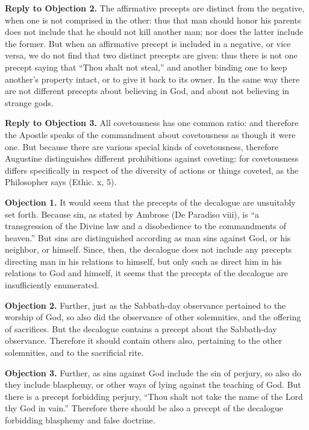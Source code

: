 \textbf{Reply to Objection 2.} The affirmative precepts are distinct from the negative, when one is not comprised in the other: thus that man should honor his parents does not include that he should not kill another man; nor does the latter include the former. But when an affirmative precept is included in a negative, or vice versa, we do not find that two distinct precepts are given: thus there is not one precept saying that ``Thou shalt not steal,'' and another binding one to keep another's property intact, or to give it back to its owner. In the same way there are not different precepts about believing in God, and about not believing in strange gods.

\textbf{Reply to Objection 3.} All covetousness has one common ratio: and therefore the Apostle speaks of the commandment about covetousness as though it were one. But because there are various special kinds of covetousness, therefore Augustine distinguishes different prohibitions against coveting: for covetousness differs specifically in respect of the diversity of actions or things coveted, as the Philosopher says (Ethic. x, 5).


\textbf{Objection 1.} It would seem that the precepts of the decalogue are unsuitably set forth. Because sin, as stated by Ambrose (De Paradiso viii), is ``a transgression of the Divine law and a disobedience to the commandments of heaven.'' But sins are distinguished according as man sins against God, or his neighbor, or himself. Since, then, the decalogue does not include any precepts directing man in his relations to himself, but only such as direct him in his relations to God and himself, it seems that the precepts of the decalogue are insufficiently enumerated.

\textbf{Objection 2.} Further, just as the Sabbath-day observance pertained to the worship of God, so also did the observance of other solemnities, and the offering of sacrifices. But the decalogue contains a precept about the Sabbath-day observance. Therefore it should contain others also, pertaining to the other solemnities, and to the sacrificial rite.

\textbf{Objection 3.} Further, as sins against God include the sin of perjury, so also do they include blasphemy, or other ways of lying against the teaching of God. But there is a precept forbidding perjury, ``Thou shalt not take the name of the Lord thy God in vain.'' Therefore there should be also a precept of the decalogue forbidding blasphemy and false doctrine.

